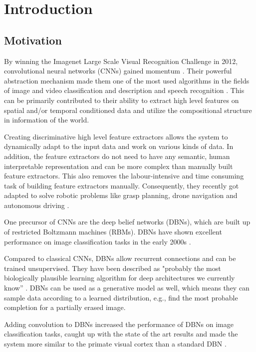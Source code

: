 \chapter{Introduction}

\section{Motivation} \label{c:motiv}

By winning the Imagenet Large Scale Visual Recognition Challenge in 2012, convolutional neural networks (CNNs) gained momentum \cite{NIPS2012_4824}. 
Their powerful abstraction mechanism made them one of the most used algorithms in the fields of image and video classification and description and speech recognition \cite{abdel2014convolutional}\cite{karpathy2014large}\cite{LeCun2015}\cite{szegedy2015going}. 
This can be primarily contributed to their ability to extract high level features on spatial and/or temporal conditioned data and utilize the compositional structure in information of the world.

Creating discriminative high level feature extractors allows the system to dynamically adapt to the input data and work on various kinds of data. 
In addition, the feature extractors do not need to have any semantic, human interpretable representation and can be more complex than manually built feature extractors. 
This also removes the labour-intensive and time consuming task of building feature extractors manually.
Consequently, they recently got adapted to solve robotic problems like grasp planning, drone navigation and autonomous driving \cite{chen2015deepdriving}\cite{giusti2016machine}\cite{levine2016learning}. 

One precursor of CNNs are the deep belief networks (DBNs), which are built up of restricted Boltzmann machines (RBMs). 
DBNs have shown excellent performance on image classification tasks in the early 2000s \cite{hinton2006fast}\cite{lee2009convolutional}.

Compared to classical CNNs, DBNs allow recurrent connections and can be trained unsupervised. 
They have been described as  "probably the most biologically plausible learning algorithm for deep architectures we currently know” \cite{bengio2015towards}. 
DBNs can be used as a generative model as well, which means they can sample data according to a learned distribution, e.g., find the most probable completion for a partially erased image.

Adding convolution to DBNs increased the performance of DBNs on image classification tasks, caught up with the state of the art results and made the system more similar to the primate visual cortex than a standard DBN \cite{lee2009convolutional}. 

